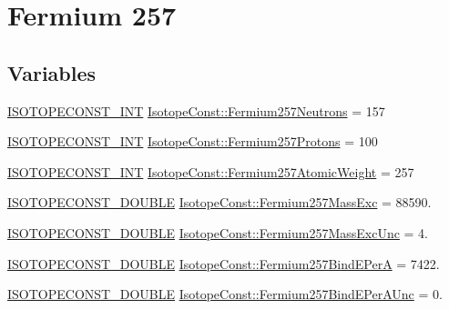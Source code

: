 \hypertarget{group___isotope_const-_fermium-_fm257}{}\section{Fermium 257}
\label{group___isotope_const-_fermium-_fm257}
\subsection*{Variables}
\begin{DoxyCompactItemize}
\item 
\mbox{\hyperlink{group___isotope_const-_macros_ga5f18360b3e99483a35c32d789e62621c}{I\+S\+O\+T\+O\+P\+E\+C\+O\+N\+S\+T\+\_\+\+I\+NT}} \mbox{\hyperlink{group___isotope_const-_fermium-_fm257_ga2d7926424c975c7605d37ac45c46a3d3}{Isotope\+Const\+::\+Fermium257\+Neutrons}} = 157
\item 
\mbox{\hyperlink{group___isotope_const-_macros_ga5f18360b3e99483a35c32d789e62621c}{I\+S\+O\+T\+O\+P\+E\+C\+O\+N\+S\+T\+\_\+\+I\+NT}} \mbox{\hyperlink{group___isotope_const-_fermium-_fm257_ga04c9726f5666e51af038bf36684039b3}{Isotope\+Const\+::\+Fermium257\+Protons}} = 100
\item 
\mbox{\hyperlink{group___isotope_const-_macros_ga5f18360b3e99483a35c32d789e62621c}{I\+S\+O\+T\+O\+P\+E\+C\+O\+N\+S\+T\+\_\+\+I\+NT}} \mbox{\hyperlink{group___isotope_const-_fermium-_fm257_ga5cff1646a7390fb647a891ea3a493b2c}{Isotope\+Const\+::\+Fermium257\+Atomic\+Weight}} = 257
\item 
\mbox{\hyperlink{group___isotope_const-_macros_ga8f45a7272ce02c0b4c65c44636ed719a}{I\+S\+O\+T\+O\+P\+E\+C\+O\+N\+S\+T\+\_\+\+D\+O\+U\+B\+LE}} \mbox{\hyperlink{group___isotope_const-_fermium-_fm257_gac9c6fd762f987069ae37ab505f15d85b}{Isotope\+Const\+::\+Fermium257\+Mass\+Exc}} = 88590.
\item 
\mbox{\hyperlink{group___isotope_const-_macros_ga8f45a7272ce02c0b4c65c44636ed719a}{I\+S\+O\+T\+O\+P\+E\+C\+O\+N\+S\+T\+\_\+\+D\+O\+U\+B\+LE}} \mbox{\hyperlink{group___isotope_const-_fermium-_fm257_gac909f72daa29fbc82dd38dfab80b21a2}{Isotope\+Const\+::\+Fermium257\+Mass\+Exc\+Unc}} = 4.
\item 
\mbox{\hyperlink{group___isotope_const-_macros_ga8f45a7272ce02c0b4c65c44636ed719a}{I\+S\+O\+T\+O\+P\+E\+C\+O\+N\+S\+T\+\_\+\+D\+O\+U\+B\+LE}} \mbox{\hyperlink{group___isotope_const-_fermium-_fm257_ga3ccab5f8a7af9fdc61bbd6758daf1fa3}{Isotope\+Const\+::\+Fermium257\+Bind\+E\+PerA}} = 7422.
\item 
\mbox{\hyperlink{group___isotope_const-_macros_ga8f45a7272ce02c0b4c65c44636ed719a}{I\+S\+O\+T\+O\+P\+E\+C\+O\+N\+S\+T\+\_\+\+D\+O\+U\+B\+LE}} \mbox{\hyperlink{group___isotope_const-_fermium-_fm257_ga2f8eb9a6a82b390fa66f6dadd0073fbc}{Isotope\+Const\+::\+Fermium257\+Bind\+E\+Per\+A\+Unc}} = 0.

\end{DoxyCompactItemize}
